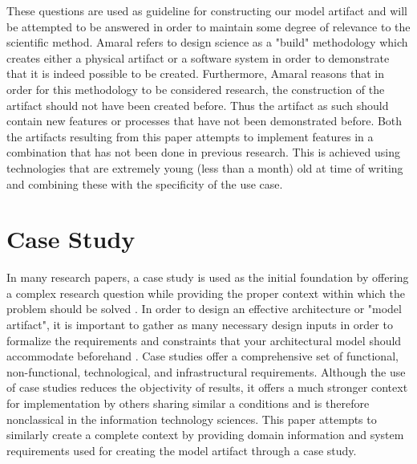 These questions are used as guideline for constructing our model artifact and will be attempted to be answered in order to maintain some degree of relevance to the scientific method. Amaral \cite{Amaral2011} refers to design science as a "build" methodology which creates either a physical artifact or a software system in order to demonstrate that it is indeed possible to be created. Furthermore, Amaral reasons that in order for this methodology to be considered research, the construction of the artifact should not have been created before. Thus the artifact as such should contain new features or processes that have not been demonstrated before. Both the artifacts resulting from this paper attempts to implement features in a combination that has not been done in previous research. This is achieved using technologies that are extremely young (less than a month) old at time of writing and combining these with the specificity of the use case. 

\section{Case Study}
In many research papers, a case study is used as the initial foundation by offering a complex research question while providing the proper context within which the problem should be solved \cite{Schell1992-cm}. In order to design an effective architecture or "model artifact", it is important to gather as many necessary design inputs in order to formalize the requirements and constraints that your architectural model should accommodate beforehand \cite{Microsoft_Patterns_Practices_Team2009-ek}. Case studies offer a comprehensive set of functional, non-functional, technological, and infrastructural requirements. 
Although the use of case studies reduces the objectivity of results, it offers a much stronger context for implementation by others sharing similar a conditions and is therefore nonclassical in the information technology sciences. This paper attempts to similarly create a complete context by providing domain information and system requirements used for creating the model artifact through a case study. 

